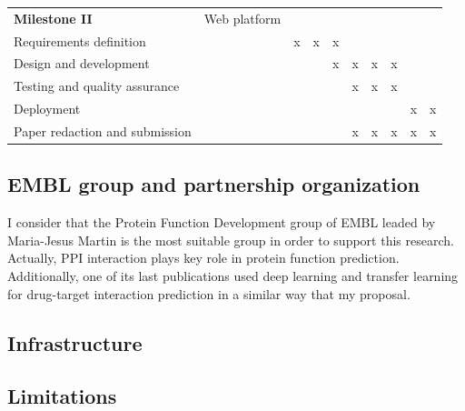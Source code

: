 \documentclass[a4paper,11pt]{article}
\begin{document}
\begin{table}[H]
{\begin{tabular}{|p{7.4cm}|p{2.3cm}|c|c|c|c|c|c|c|c|}
			\textbf{Milestone II} & Web platform & & & & & & & & \\
			Requirements definition &  &     x                &    x                    &            x             &                       &                      &                       &                               &                   \\
			Design and development &  &                     &                        &                 x        & x                      & x                     & x                      &                               &                   \\
			Testing and quality assurance &  &                     &                        &                         & x                      & x                     & x                      &                               &                   \\
			Deployment  &                                      &                       &                        &                         &                        &                      &                       & x                                         & x    \\
			Paper redaction and submission    &                              &                       &                        &                         &              x         &             x         &                x       & x                                       & x     \\ \hline
		\end{tabular}
	}
\end{table}

\subsection{EMBL group and partnership organization}
I consider that the Protein Function Development group of EMBL leaded by Maria-Jesus Martin is the most suitable group in order to support this research. Actually, PPI interaction plays key role in protein function prediction. Additionally, one of its last publications \cite{dalkiran2023transfer} used deep learning and transfer learning for drug-target interaction prediction in a similar way that my proposal. 

\subsection{Infrastructure}

\subsection{Limitations}
\end{document}
